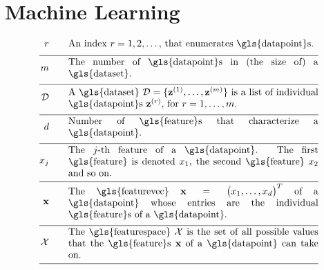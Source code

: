 \newpage
\section*{Machine Learning}

\begin{align}
	\sampleidx \quad\quad & \parbox{.75\textwidth}{An index $\sampleidx=1,2,\ldots,$ that 
		enumerates \gls{datapoint}s.}   \nonumber \\[2mm] \hline \nonumber\\[-5mm]
	\samplesize \quad\quad &\parbox{.75\textwidth}{The number of \gls{datapoint}s in (the size of) a \gls{dataset}.} \nonumber \\[2mm] \hline \nonumber\\[-5mm] 
	\dataset \quad\quad & \parbox{.75\textwidth}{A \gls{dataset} $\dataset = \{ \datapoint^{(1)},\ldots, \datapoint^{(\samplesize)} \}$ 
		is a list of individual \gls{datapoint}s $\datapoint^{(\sampleidx)}$, for $\sampleidx=1,\ldots,\samplesize$.}   \nonumber \\[2mm] \hline \nonumber\\[-5mm]
	\featurelen \quad\quad &\parbox{.75\textwidth}{Number of \gls{feature}s that characterize a \gls{datapoint}.}\nonumber \\[2mm] \hline \nonumber\\[-5mm]
	\feature_{\featureidx} \quad\quad &\parbox{.75\textwidth}{The $\featureidx$-th feature of a \gls{datapoint}. The first \gls{feature} 
		is denoted $\feature_{1}$, the second \gls{feature} $\feature_{2}$ and so on. } \nonumber \\[2mm] \hline \nonumber\\[-5mm] 
	\featurevec \quad\quad &\parbox{.75\textwidth}{The \gls{featurevec} $\featurevec=\big(\feature_{1},\ldots,\feature_{\featuredim}\big)^{T}$ of a \gls{datapoint} whose entries 
		are the individual \gls{feature}s of a \gls{datapoint}.}\nonumber \\[2mm] \hline \nonumber\\[-5mm]
	\featurespace \quad\quad & \parbox{.75\textwidth}{The \gls{featurespace} $\featurespace$ is 
		the set of all possible values that the \gls{feature}s $\featurevec$ of a \gls{datapoint} can take on.} \nonumber \\[2mm] \hline \nonumber\\[-5mm]

\end{align}
